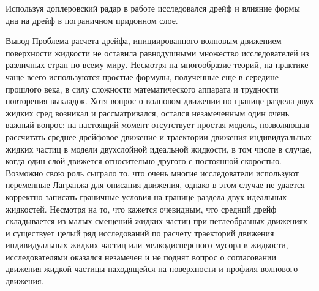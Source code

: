 Используя доплеровский радар в работе \cite{marin2004eddy} исследовался дрейф и влияние формы дна на дрейф в пограничном придонном слое.



Вывод
Проблема расчета дрейфа, инициированного волновым движением поверхности жидкости не оставила равнодушными множество исследователей из различных стран по всему миру. 
Несмотря на многообразие теорий, на практике чаще всего используются простые формулы, полученные еще в середине прошлого века, в силу сложности математического аппарата и трудности повторения выкладок. 
Хотя вопрос о волновом движении по границе раздела двух жидких сред возникал и рассматривался, остался незамеченным один очень важный вопрос: на настоящий момент отсутствует простая модель, позволяющая рассчитать среднее дрейфовое движение и траектории движения индивидуальных жидких частиц в модели двухслойной идеальной жидкости, в том числе в случае, когда один слой движется относительно другого с постоянной скоростью. Возможно свою роль сыграло то, что очень многие исследователи используют переменные Лагранжа для описания движения, однако в этом случае не удается корректно записать граничные условия на границе раздела двух идеальных жидкостей.
Несмотря на то, что кажется очевидным, что средний дрейф складывается из малых смещений жидких частиц при петлеобразных движениях и существует целый ряд исследований по расчету траекторий движения индивидуальных жидких частиц или мелкодисперсного мусора в жидкости, исследователями оказался незамечен и не поднят вопрос о согласовании движения жидкой частицы находящейся на поверхности и профиля волнового движения. 
